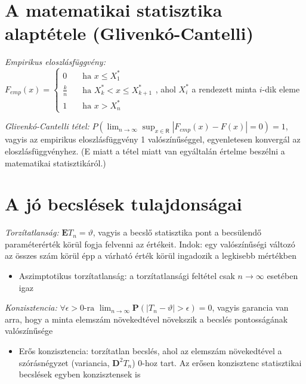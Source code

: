 \section{A matematikai statisztika alaptétele (Glivenkó-Cantelli)}

\emph{Empirikus eloszlásfüggvény:}\\
$F_{emp}(x) = 
  \begin{cases}
    0       & \quad \text{ha } x \leq X_1^* \\
    \frac{k}{n}  & \quad \text{ha } X_k^* < x \leq X_{k+1}^*\\
    1		& \quad \text{ha } x>X_n^* \end{cases}
$, ahol $X_i^*$ a rendezett minta $i$-dik eleme

\emph{Glivenkó-Cantelli tétel:} $P(\lim_{n\rightarrow \infty}\sup_{x\in\mathsf{R}}|F_{emp}(x)-F(x)|=0)=1$, vagyis az empirikus eloszlásfüggvény 1 valószínűséggel, egyenletesen konvergál az eloszlásfüggvényhez. (E miatt a tétel miatt van egyáltalán értelme beszélni a matematikai statisztikáról.)

\section{A jó becslések tulajdonságai}

\emph{Torzítatlanság:} $\mathbf{E}T_n=\vartheta$, vagyis a becslő statisztika pont a becsülendő paraméterérték körül fogja felvenni az értékeit. Indok: egy valószínűségi változó az összes szám körül épp a várható érték körül ingadozik a legkisebb mértékben
	\begin{itemize}
	\item Aszimptotikus torzítatlanság: a torzítatlansági feltétel csak $n \to \infty$ esetében igaz
	\end{itemize}

\emph{Konzisztencia:} $\forall \epsilon >0 \text{-ra } \lim_{n \to \infty}\mathbf{P}(|T_n-\vartheta|>\epsilon) = 0$, vagyis garancia van arra, hogy a minta elemszám növekedtével növekszik a becslés pontosságának valószínűsége
	\begin{itemize}
	\item Erős konzisztencia: torzítatlan becslés, ahol az elemszám növekedtével a szórásnégyzet (variancia, $\mathbf{D}^2T_n$) 0-hoz tart. Az erősen konzisztenc statisztikai becslések egyben konzisztensek is
	\end{itemize}

